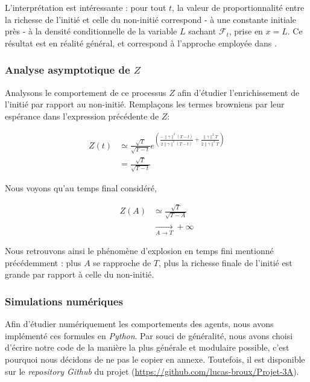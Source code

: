 \documentclass[../finalreport.tex]{subfiles}
\begin{document}
\par L'interprétation est intéressante : pour tout $t$, la valeur de proportionnalité entre la richesse de l'initié et celle du non-initié correspond - à une constante initiale près -  à la densité conditionnelle de la variable $L$ sachant $\mathcal{F}_t$, prise en $x = L$. Ce résultat est en réalité général, et correspond à l'approche employée dans \cite{art5}.

\subsubsection{Analyse asymptotique de $Z$}

\par Analysons le comportement de ce processus $Z$ afin d'étudier l'enrichissement de l'initié par rapport au non-initié. Remplaçons les termes browniens par leur espérance dans l'expression précédente de $Z$:

\begin{displaymath}
	\begin{split}
	Z \left( t \right) &\simeq \frac{\sqrt{T}}{\sqrt{T - t}} e^{\left( \frac{- \| \gamma \|^2 \left( T  - t \right) }{2 \| \gamma \|^2 \left( T - t \right)} + \frac{\| \gamma \|^2 T }{2 \| \gamma \|^2 T } \right) } \\
	&= \frac{\sqrt{T}}{\sqrt{T - t}}
	\end{split}
\end{displaymath}

\par Nous voyons qu'au temps final considéré,

\begin{displaymath}
	\begin{split}
	Z \left( A \right) &\simeq \frac{\sqrt{T}}{\sqrt{T - A}} \\
	&\xrightarrow[A \to T]{} + \infty
	\end{split}
\end{displaymath}

\par Nous retrouvons ainsi le phénomène d'explosion en temps fini mentionné précédemment : plus $A$ se rapproche de $T$, plus la richesse finale de l'initié est grande par rapport à celle du non-initié.

\subsubsection{Simulations numériques}

\par Afin d'étudier numériquement les comportements des agents, nous avons implémenté ces formules en \emph{Python}. Par souci de généralité, nous avons choisi d'écrire notre code de la manière la plus générale et modulaire possible, c'est pourquoi nous décidons de ne pas le copier en annexe. Toutefois, il est disponible sur le \emph{repository Github} du projet (\url{https://github.com/lucas-broux/Projet-3A}).
\end{document}
